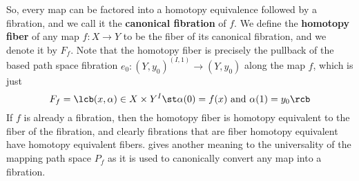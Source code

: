 So, every map can be factored into a homotopy equivalence followed by a fibration, and we call it the \textbf{canonical fibration} of $f$. We define the \textbf{homotopy fiber} of any map $f : X \rightarrow Y$ to be the fiber of its canonical fibration, and we denote it by $F_f$. Note that the homotopy fiber is precisely the pullback of the based path space fibration $e_0 : (Y,y_0)^{(I,1)} \rightarrow (Y,y_0)$ along the map $f$, which is just
\begin{equation}
\label{homotopy fiber of a map}
F_f = \lcb (x,\alpha) \in X \times Y^I \st \alpha(0) = f(x) \text{ and } \alpha(1)=y_0 \rcb
\end{equation}
If $f$ is already a fibration, then the homotopy fiber is homotopy equivalent to the fiber of the fibration, and clearly fibrations that are fiber homotopy equivalent have homotopy equivalent fibers.  gives another meaning to the universality of the mapping path space $P_f$ as it is used to canonically convert any map into a fibration.


